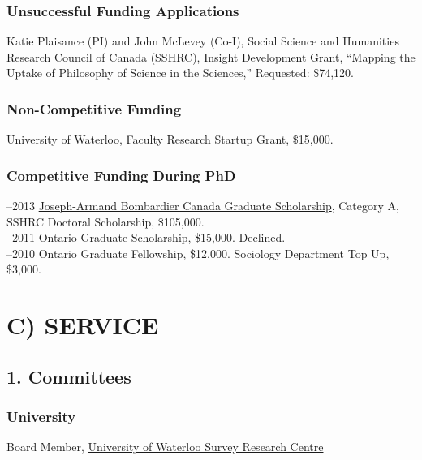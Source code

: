 \documentclass[9pt,usenames,dvipsnames]{article}
\begin{document}
\subsubsection*{Unsuccessful Funding Applications}

\ind Katie Plaisance (PI) and John McLevey (Co-I), Social Science and Humanities Research Council of Canada (SSHRC), Insight Development Grant, ``Mapping the Uptake of Philosophy of Science in the Sciences,'' Requested: \$74,120. 

\subsubsection*{Non-Competitive Funding}

 University of Waterloo, Faculty Research Startup Grant, \$15,000.   

\subsubsection*{Competitive Funding During PhD}

–2013 \href{http://www.sshrc-crsh.gc.ca/funding-financement/programs-programmes/fellowships/doctoral-doctorat-eng.aspx}{Joseph-Armand Bombardier Canada Graduate Scholarship}, Category A, SSHRC Doctoral Scholarship, \$105,000.\\

–2011 Ontario Graduate Scholarship, \$15,000. Declined.\\

–2010 Ontario Graduate Fellowship, \$12,000. Sociology Department Top Up, \$3,000.\\

\section*{C) SERVICE} 

\subsection*{1. Committees}

\subsubsection*{University}

 Board Member, \href{http://math.uwaterloo.ca/survey-research-centre/node/1}{University of Waterloo Survey Research Centre} 
\end{document}
